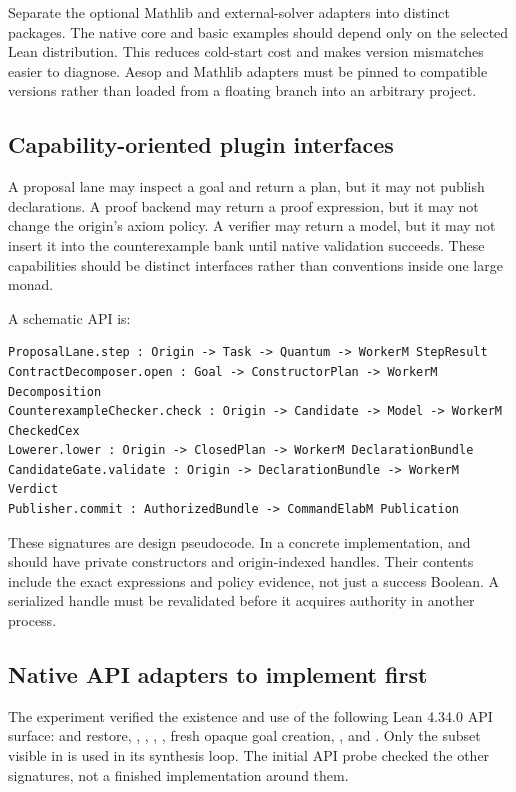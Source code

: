 Separate the optional Mathlib and external-solver adapters into distinct packages. The native core and basic examples should depend only on the selected Lean distribution. This reduces cold-start cost and makes version mismatches easier to diagnose. Aesop and Mathlib adapters must be pinned to compatible versions rather than loaded from a floating branch into an arbitrary project.

\subsection{Capability-oriented plugin interfaces}

A proposal lane may inspect a goal and return a plan, but it may not publish declarations. A proof backend may return a proof expression, but it may not change the origin's axiom policy. A verifier may return a model, but it may not insert it into the counterexample bank until native validation succeeds. These capabilities should be distinct interfaces rather than conventions inside one large monad.

A schematic API is:
\begin{lstlisting}[language={}]
ProposalLane.step : Origin -> Task -> Quantum -> WorkerM StepResult
ContractDecomposer.open : Goal -> ConstructorPlan -> WorkerM Decomposition
CounterexampleChecker.check : Origin -> Candidate -> Model -> WorkerM CheckedCex
Lowerer.lower : Origin -> ClosedPlan -> WorkerM DeclarationBundle
CandidateGate.validate : Origin -> DeclarationBundle -> WorkerM Verdict
Publisher.commit : AuthorizedBundle -> CommandElabM Publication
\end{lstlisting}
These signatures are design pseudocode. In a concrete implementation,  and  should have private constructors and origin-indexed handles. Their contents include the exact expressions and policy evidence, not just a success Boolean. A serialized handle must be revalidated before it acquires authority in another process.

\subsection{Native API adapters to implement first}

The experiment verified the existence and use of the following Lean 4.34.0 API surface:  and restore, , , , , fresh opaque goal creation, , and . Only the subset visible in  is used in its synthesis loop. The initial API probe checked the other signatures, not a finished implementation around them.

